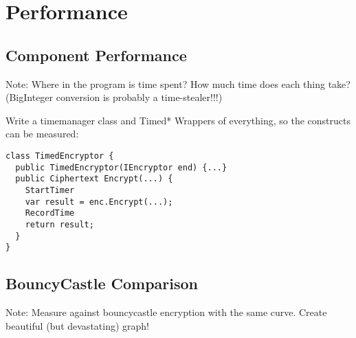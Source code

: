 \section{Performance}
\label{sec:performance}

\subsection{Component Performance}
\label{sec:performance_components}

Note: Where in the program is time spent? How much time does each thing take? (BigInteger conversion is probably
a time-stealer!!!)

Write a timemanager class and Timed* Wrappers of everything, so the constructs can be measured:

\begin{verbatim}
class TimedEncryptor {
  public TimedEncryptor(IEncryptor end) {...}
  public Ciphertext Encrypt(...) {
    StartTimer
    var result = enc.Encrypt(...);
    RecordTime
    return result;
  }
}
\end{verbatim}

\subsection{BouncyCastle Comparison}
\label{sec:performance_bouncycastle}
Note: Measure against bouncycastle encryption with the same curve. Create beautiful (but devastating) graph!